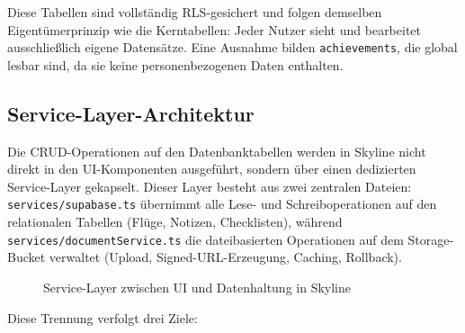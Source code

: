 Diese Tabellen sind vollständig RLS-gesichert und folgen demselben
Eigentümerprinzip wie die Kerntabellen: Jeder Nutzer sieht und bearbeitet
ausschließlich eigene Datensätze.
Eine Ausnahme bilden \texttt{achievements}, die global lesbar sind, da sie
keine personenbezogenen Daten enthalten.

\subsection{Service-Layer-Architektur}

Die CRUD-Operationen auf den Datenbanktabellen werden in Skyline nicht direkt
in den UI-Komponenten ausgeführt, sondern über einen dedizierten Service-Layer
gekapselt.
Dieser Layer besteht aus zwei zentralen Dateien:
\texttt{services/supabase.ts} übernimmt alle Lese- und Schreiboperationen
auf den relationalen Tabellen (Flüge, Notizen, Checklisten),
während \texttt{services/documentService.ts} die dateibasierten Operationen
auf dem Storage-Bucket verwaltet (Upload, Signed-URL-Erzeugung, Caching,
Rollback).

\begin{figure}[H]
  \centering
  \caption{Service-Layer zwischen UI und Datenhaltung in Skyline}
  \label{fig:service_layer}
\end{figure}

Diese Trennung verfolgt drei Ziele:

